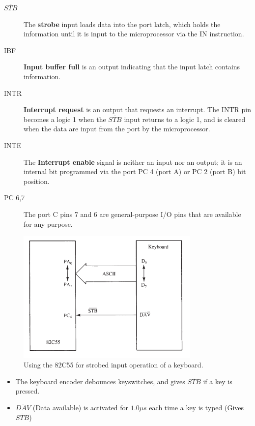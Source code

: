 \begin{description}
  \item[$\overline{STB}$] The \textbf{strobe} input loads data into the port latch, which holds the information until it is input to the microprocessor via the IN instruction.
  \item[IBF] \textbf{Input buffer full} is an output indicating that the input latch contains information.
  \item[INTR] \textbf{Interrupt request} is an output that requests an interrupt. The INTR pin becomes a logic 1 when the $\overline{STB}$ input returns to a logic 1, and is cleared when the data are input from the port by the microprocessor.
  \item[INTE] The \textbf{Interrupt enable} signal is neither an input nor an output; it is an internal bit programmed via the port PC 4 (port A) or PC 2 (port B) bit position.
  \item[PC 6,7] The port C pins 7 and 6 are general-purpose I/O pins that are available for any purpose.

\end{description}
\begin{figure}[h!]
  \includegraphics[width = 0.8\textwidth]{./figures/Strobed.png}
  \caption{Using the 82C55 for strobed input operation of a keyboard.}
\end{figure}
\begin{itemize}
  \item The keyboard encoder debounces keyswitches, and gives $\overline{STB}$ if a key is pressed.
  \item $\overline{DAV}$ (Data available) is activated for $1.0 \mu s$ each time a key is typed (Gives $\overline{STB}$)
\end{itemize}


